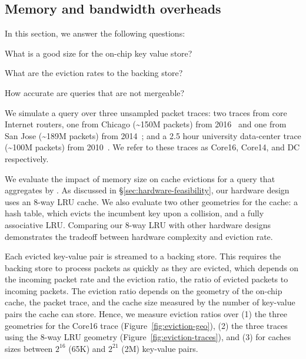 \subsection{Memory and bandwidth overheads}
\label{s:eval:traces}
\label{sec:eval:traces}

In this section, we answer the following questions:
\begin{CompactEnumerate}
\item What is a good size for the on-chip key value store?
\item What are the eviction rates to the backing store?
\item How accurate are queries that are not mergeable?
\end{CompactEnumerate}

  We simulate a \TheSystem query over three unsampled
packet traces: two traces from \tenglink core Internet routers, one from
Chicago (\textasciitilde{}150M packets) from 2016~\cite{caida2016} and one from
San Jose (\textasciitilde{}189M packets) from 2014~\cite{caida2014}; and a 2.5
hour university data-center trace (\textasciitilde{}100M packets) from
2010~\cite{bensonDC}. We refer to these traces as Core16, Core14, and DC
respectively.

We evaluate the impact of memory size on cache evictions for a \TheSystem query
that aggregates by \txtftuple.  As discussed in
\S\ref{sec:hardware-feasibility}, our hardware design uses an 8-way LRU cache.
We also evaluate two other geometries for the cache: a hash table, which evicts
the incumbent key upon a collision, and a fully associative LRU. Comparing our
8-way LRU with other hardware designs demonstrates the tradeoff between
hardware complexity and eviction rate.

Each evicted key-value pair is streamed to a backing store.  This requires the
backing store to process packets as quickly as they are evicted, which depends
on the incoming packet rate and the eviction ratio, \ie the ratio of evicted
packets to incoming packets.  The eviction ratio depends on the geometry of the
on-chip cache, the packet trace, and the cache size measured by the number of
key-value pairs the cache can store. Hence, we measure eviction ratios over (1) the
three geometries for the Core16 trace (Figure~\ref{fig:eviction-geo}), (2) the
three traces using the 8-way LRU geometry (Figure~\ref{fig:eviction-traces}),
and (3) for caches sizes between $2^{16}$ (65K) and $2^{21}$ (2M) key-value
pairs.

